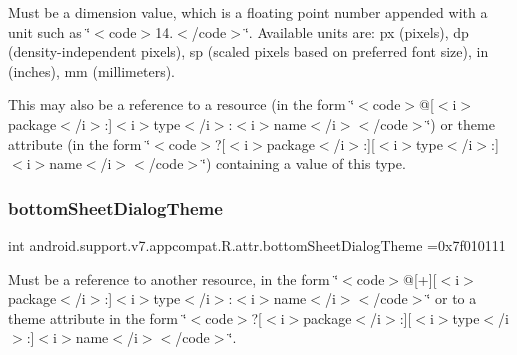 Must be a dimension value, which is a floating point number appended with a unit such as \char`\"{}$<$code$>$14.\+5sp$<$/code$>$\char`\"{}. Available units are\+: px (pixels), dp (density-\/independent pixels), sp (scaled pixels based on preferred font size), in (inches), mm (millimeters). 

This may also be a reference to a resource (in the form \char`\"{}$<$code$>$@\mbox{[}$<$i$>$package$<$/i$>$\+:\mbox{]}$<$i$>$type$<$/i$>$\+:$<$i$>$name$<$/i$>$$<$/code$>$\char`\"{}) or theme attribute (in the form \char`\"{}$<$code$>$?\mbox{[}$<$i$>$package$<$/i$>$\+:\mbox{]}\mbox{[}$<$i$>$type$<$/i$>$\+:\mbox{]}$<$i$>$name$<$/i$>$$<$/code$>$\char`\"{}) containing a value of this type. \mbox{\label{classandroid_1_1support_1_1v7_1_1appcompat_1_1R_1_1attr_a3fee06f2eb3a9ae15a03adaeda42147b}} 
\subsubsection{\texorpdfstring{bottom\+Sheet\+Dialog\+Theme}{bottomSheetDialogTheme}}
{\footnotesize\ttfamily int android.\+support.\+v7.\+appcompat.\+R.\+attr.\+bottom\+Sheet\+Dialog\+Theme =0x7f010111\hspace{0.3cm}{\ttfamily [static]}}

Must be a reference to another resource, in the form \char`\"{}$<$code$>$@\mbox{[}+\mbox{]}\mbox{[}$<$i$>$package$<$/i$>$\+:\mbox{]}$<$i$>$type$<$/i$>$\+:$<$i$>$name$<$/i$>$$<$/code$>$\char`\"{} or to a theme attribute in the form \char`\"{}$<$code$>$?\mbox{[}$<$i$>$package$<$/i$>$\+:\mbox{]}\mbox{[}$<$i$>$type$<$/i$>$\+:\mbox{]}$<$i$>$name$<$/i$>$$<$/code$>$\char`\"{}. \mbox{\label{classandroid_1_1support_1_1v7_1_1appcompat_1_1R_1_1attr_a4ac92cbe973891bb7a82263ec54fdd6e}} 
